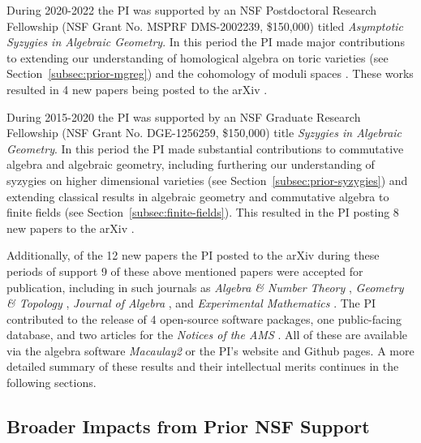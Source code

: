 \documentclass[11pt,reqno]{amsart}
\theoremstyle{remark}
\begin{document}
During 2020-2022 the PI was supported by an NSF Postdoctoral Research Fellowship (NSF Grant No. MSPRF DMS-2002239, \$150,000) titled \textit{Asymptotic Syzygies in Algebraic Geometry}. In this period the PI made major contributions to extending our understanding of homological algebra on toric varieties (see Section~\ref{subsec:prior-mgreg}) and the cohomology of moduli spaces \cite{BBCMMW22}. These works resulted in 4 new papers being posted to the arXiv \cite{BCEGLY22,bruceHellerSayrafi21,bruceHellerSayrafi22,BBCMMW22}.

During 2015-2020 the PI was supported by an NSF Graduate Research Fellowship (NSF Grant No. DGE-1256259, \$150,000) title \textit{Syzygies in Algebraic Geometry}. In this period the PI made substantial contributions to commutative algebra and algebraic geometry, including furthering our understanding of syzygies on higher dimensional varieties (see Section~\ref{subsec:prior-syzygies}) and extending classical results in algebraic geometry and commutative algebra to finite fields (see Section~\ref{subsec:finite-fields}). This resulted in the PI posting 8 new papers to the arXiv \cite{almousaBruce19,BBBKR17,bruceErman-sop,bruceLi19,bruceErmanGoldsteinYang18,bruceErman19,bruce19-semiample,bruce19-hirzebruch}.

Additionally, of the 12 new papers the PI posted to the arXiv during these periods of support 9 of these above mentioned papers were accepted for publication, including in such journals as \textit{Algebra \& Number Theory} \cite{bruceErman-sop}, \textit{Geometry \& Topology} \cite{BBCMMW22}, \textit{Journal of Algebra} \cite{BCEGLY22}, and \textit{Experimental Mathematics} \cite{bruceErmanGoldsteinYang18}. The PI contributed to the release of 4 open-source software packages, one public-facing database, and two articles for the \textit{Notices of the AMS} \cite{bruceNotices21,bruceNotices22}. All of these are available via the algebra software \textit{Macaulay2} or the PI's website and Github pages. A more detailed summary of these results and their intellectual merits continues in the following sections. 
\subsection{Broader Impacts from Prior NSF Support}
\end{document}
